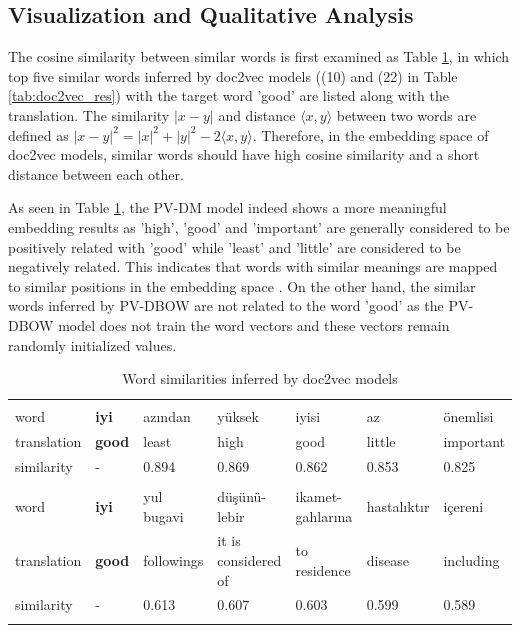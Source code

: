 \subsection{Visualization and Qualitative Analysis}

The cosine similarity between similar words is first examined as Table \ref{tab:word_similarity}, in which top five similar words inferred by doc2vec models ((10) and (22) in Table \ref{tab:doc2vec_res}) with the target word 'good' are listed along with the translation. The similarity $|x - y|$ and distance $\langle x,y \rangle$ between two words are defined as $|x-y|^2 = |x|^2 + |y|^2 - 2\langle x,y\rangle$. Therefore, in the embedding space of doc2vec models, similar words should have high cosine similarity and a short distance between each other. 

As seen in Table \ref{tab:word_similarity}, the PV-DM model indeed shows a more meaningful embedding results as 'high', 'good' and 'important' are generally considered to be positively related with 'good' while 'least' and 'little' are considered to be negatively related. This indicates that words with similar meanings are mapped to similar positions in the embedding space \cite{mikolov2014}. On the other hand, the similar words inferred by PV-DBOW are not related to the word 'good' as the PV-DBOW model does not train the word vectors and these vectors remain randomly initialized values.


\begin{table}[htb]
    \centering
    \small
    \caption{Word similarities inferred by doc2vec models}
    \begin{tabular}{l|p{1cm}|p{1.5cm}|p{1.5cm}|p{1.5cm}|p{1.7cm}|p{1.5cm}}
        \Xhline{2\arrayrulewidth}
        \multicolumn{7}{l}{PV-DM} \\
        \Xhline{2\arrayrulewidth}
        word & \textbf{iyi} & azından & yüksek & iyisi & az & önemlisi \\
        \hline
        translation & \textbf{good} & least & high & good & little & important \\
        \hline
        similarity & - & 0.894 & 0.869 & 0.862 & 0.853 & 0.825 \\
        \Xhline{2\arrayrulewidth}
        \multicolumn{7}{l}{PV-DBOW} \\
        \Xhline{2\arrayrulewidth}
        word & \textbf{iyi} & yul bugavi & düşünü- lebir & ikamet- gahlarına & hastalıktır & içereni \\
        \hline
        translation & \textbf{good} & followings & it is considered of & to residence & disease & including \\
        \hline
        similarity & - & 0.613 & 0.607 & 0.603 & 0.599 & 0.589 \\
        \Xhline{2\arrayrulewidth}
    \end{tabular}
    \label{tab:word_similarity}
\end{table}


